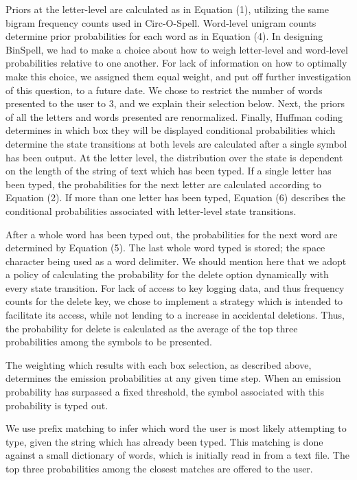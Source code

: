 \documentclass[12pt,titlepage]{article}
\begin{document}
Priors at the letter-level are calculated as in Equation (1), utilizing the same bigram frequency counts 
used in Circ-O-Spell.  Word-level unigram counts determine prior probabilities for each word 
as in Equation (4).  In designing BinSpell, we had to make a choice about how to weigh letter-level and 
word-level probabilities relative to one another.  For lack of information on how to optimally make this 
choice, we assigned them equal weight, and put off further investigation of this question, to a future 
date.  We chose to restrict the number of words presented to the user to 3, and we explain their 
selection below.  Next, the priors of all the letters and words presented are renormalized.  Finally, 
Huffman coding determines in which box they will be displayed conditional probabilities which 
determine the state transitions at both levels are calculated after a single symbol has been output.  At 
the letter level, the distribution over the state is dependent on the length of the string of text which has 
been typed.  If a single letter has been typed, the probabilities for  the next letter are calculated 
according to Equation (2).  If more than one letter has been typed, Equation (6) describes the 
conditional probabilities associated with letter-level state transitions.

After a whole word has been typed out, the probabilities for the next word are determined by Equation 
(5).  The last whole word typed is stored; the space character being used as a word delimiter.  We 
should mention here that we adopt a policy of calculating the probability for the delete option 
dynamically with every state transition.  For lack of access to key logging data, and thus frequency 
counts for the delete key, we chose to implement a strategy which is intended to facilitate its access, 
while not lending to a increase in accidental deletions.   Thus, the probability for delete is calculated as 
the average of the top three probabilities among the symbols to be presented.

The weighting which results with each box selection, as described above, determines the emission 
probabilities at any given time step.  When an emission probability has surpassed a fixed threshold, the 
symbol associated with this probability is typed out.

We use prefix matching to infer which word the user is most likely attempting to type, given the string 
which has already been typed.  This matching is done against a small dictionary of words, which is 
initially read in from a text file.  The top three probabilities among the closest matches are offered to 
the user.
\end{document}
